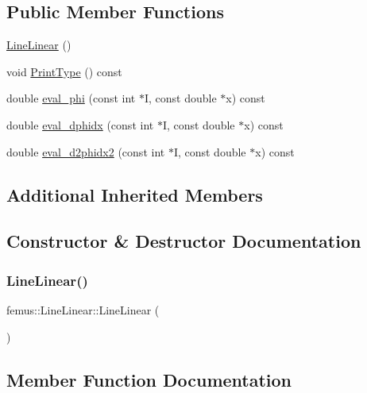\subsection*{Public Member Functions}
\begin{DoxyCompactItemize}
\item 
\mbox{\hyperlink{classfemus_1_1_line_linear_af87aaf16ee1109133b5b752bc4b26cf0}{Line\+Linear}} ()
\item 
void \mbox{\hyperlink{classfemus_1_1_line_linear_af205b1d34401f8c9aeebb4ee52bb2231}{Print\+Type}} () const
\item 
double \mbox{\hyperlink{classfemus_1_1_line_linear_a1daec56d3bf6106b18291be2adadb3c5}{eval\+\_\+phi}} (const int $\ast$I, const double $\ast$x) const
\item 
double \mbox{\hyperlink{classfemus_1_1_line_linear_a1f690ee24508fe7e2a3b552bf6921e96}{eval\+\_\+dphidx}} (const int $\ast$I, const double $\ast$x) const
\item 
double \mbox{\hyperlink{classfemus_1_1_line_linear_a3f8cf26c387b50cdd41d39527c4260d1}{eval\+\_\+d2phidx2}} (const int $\ast$I, const double $\ast$x) const
\end{DoxyCompactItemize}
\subsection*{Additional Inherited Members}


\subsection{Constructor \& Destructor Documentation}
\mbox{\label{classfemus_1_1_line_linear_af87aaf16ee1109133b5b752bc4b26cf0}} 
\subsubsection{\texorpdfstring{Line\+Linear()}{LineLinear()}}
{\footnotesize\ttfamily femus\+::\+Line\+Linear\+::\+Line\+Linear (\begin{DoxyParamCaption}{ }\end{DoxyParamCaption})\hspace{0.3cm}{\ttfamily [inline]}}



\subsection{Member Function Documentation}
\mbox{\label{classfemus_1_1_line_linear_a3f8cf26c387b50cdd41d39527c4260d1}} 
